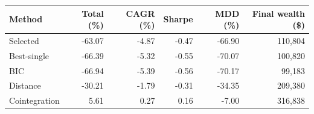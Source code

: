 \begin{tabular}{@{}lrrrrr@{}}
\toprule
Method & Total (\%) & CAGR (\%) & Sharpe & MDD (\%) & Final wealth (\$) \\
\midrule
Selected & -63.07 & -4.87 & -0.47 & -66.90 & 110,804 \\
Best-single & -66.39 & -5.32 & -0.55 & -70.07 & 100,820 \\
BIC & -66.94 & -5.39 & -0.56 & -70.17 & 99,183 \\
Distance & -30.21 & -1.79 & -0.31 & -34.35 & 209,380 \\
Cointegration & 5.61 & 0.27 & 0.16 & -7.00 & 316,838 \\
\bottomrule
\end{tabular}
